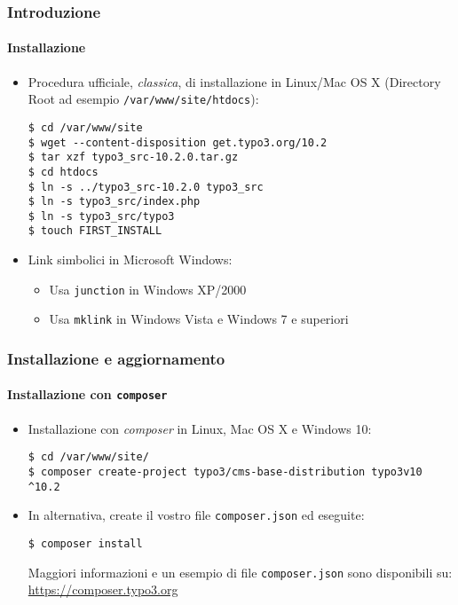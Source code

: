 
\begin{frame}[fragile]
	\frametitle{Introduzione}
	\framesubtitle{Installazione}

	\begin{itemize}
		\item Procedura ufficiale, \textit{classica}, di installazione in Linux/Mac OS X\newline
			(Directory Root ad esempio \texttt{/var/www/site/htdocs}):
\begin{lstlisting}
$ cd /var/www/site
$ wget --content-disposition get.typo3.org/10.2
$ tar xzf typo3_src-10.2.0.tar.gz
$ cd htdocs
$ ln -s ../typo3_src-10.2.0 typo3_src
$ ln -s typo3_src/index.php
$ ln -s typo3_src/typo3
$ touch FIRST_INSTALL
\end{lstlisting}

		\item Link simbolici in Microsoft Windows:

			\begin{itemize}
				\item Usa \texttt{junction} in Windows XP/2000
				\item Usa \texttt{mklink} in Windows Vista e Windows 7 e superiori
			\end{itemize}

	\end{itemize}
\end{frame}


\begin{frame}[fragile]
	\frametitle{Installazione e aggiornamento}
	\framesubtitle{Installazione con \texttt{composer}}

	\begin{itemize}
		\item Installazione con \textit{composer} in Linux, Mac OS X e Windows 10:
\begin{lstlisting}
$ cd /var/www/site/
$ composer create-project typo3/cms-base-distribution typo3v10 ^10.2
\end{lstlisting}

		\item In alternativa, create il vostro file \texttt{composer.json} ed eseguite:
\begin{lstlisting}
$ composer install
\end{lstlisting}

			Maggiori informazioni e un esempio di file \texttt{composer.json} sono disponibili su:\newline
			\smaller
				\href{https://composer.typo3.org}{https://composer.typo3.org}
			\normalsize

	\end{itemize}
\end{frame}

